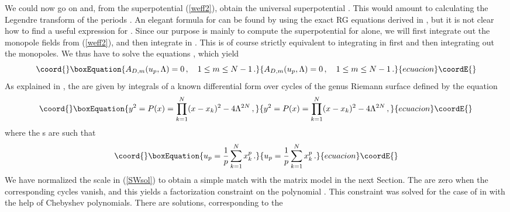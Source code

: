 \documentclass[a4paper,12pt]{article}
\def\suN{{\rm SU}(N)}
\begin{document}
We could now go on and, from the superpotential (\ref{weff2}), obtain
the universal superpotential \coordHE{}. This
would amount to calculating the Legendre transform of the periods
\coordHE{}. An elegant formula for \coordHE{} can be found by using the exact RG
equations derived in \cite{RGN2}, but it is not clear how to find a
useful expression for \coordHE{}. Since our purpose is mainly to compute
the superpotential \coordHE{} for \coordHE{} alone, we will first integrate out
the monopole fields from (\ref{weff2}), and then integrate in \coordHE{}. 
This is of course strictly equivalent to integrating in \coordHE{} first and 
then integrating out the monopoles. We thus have to solve the 
equations \coordHE{}, which yield
%
\begin{equation}\coord{}\boxEquation{
\label{ADeq}
A_{D,m}(u_{p},\L) = 0\, ,\quad 1\leq m\leq N-1\, .
}{
A_{D,m}(u_{p},\L) = 0\, ,\quad 1\leq m\leq N-1\, .
}{ecuacion}\coordE{}\end{equation}
%
As explained in \cite{SW1,SW2}, the \coordHE{} are given by integrals
of a known differential form over cycles of the genus \coordHE{} Riemann
surface defined by the equation
%
\begin{equation}\coord{}\boxEquation{
\label{SWsol}
y^{2} = P(x) = \prod_{k=1}^{N} (x-x_{k})^{2} - 4\L^{2N}\, ,
}{
y^{2} = P(x) = \prod_{k=1}^{N} (x-x_{k})^{2} - 4\L^{2N}\, ,
}{ecuacion}\coordE{}\end{equation}
%
where the \coordHE{}s are such that
%
\begin{equation}\coord{}\boxEquation{
\label{Udef}
u_{p} = {1\over p}\sum_{k=1}^{N}x_{k}^{p}\, .
}{
u_{p} = {1\over p}\sum_{k=1}^{N}x_{k}^{p}\, .
}{ecuacion}\coordE{}\end{equation}
%
We have normalized the scale \myHighlight{$\L$}\coordHE{} in (\ref{SWsol}) to obtain a simple 
match with the matrix model in the next Section.
The \coordHE{} are zero when the corresponding cycles vanish, and this 
yields a factorization constraint on the polynomial \coordHE{}. This 
constraint was solved for the case of \myHighlight{$\suN$}\coordHE{} in \cite{DS} with the help of 
Chebyshev polynomials. There are \coordHE{} solutions, corresponding to the \coordHE{} 
\end{document}

